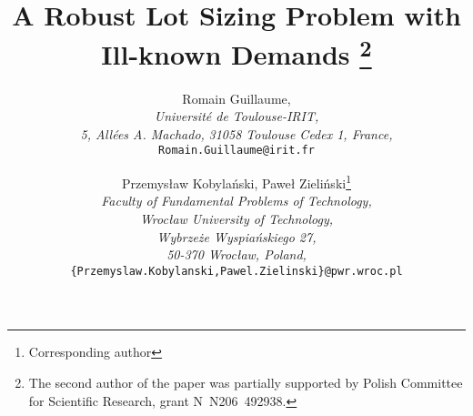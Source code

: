 \documentclass[11pt]{article}
\newenvironment{keyword}{\par{\noindent\bf Keywords:}}
\begin{document}
\title{A  Robust Lot Sizing Problem with Ill-known Demands
\thanks{The second author of the paper 
was partially supported by 
Polish Committee for Scientific Research, grant
 N~N206~492938.}
}





 
\author{
Romain    Guillaume,\\
{\small \textit{Universit{\'e} de Toulouse-IRIT,}}\\
{\small \textit{5, All{\'e}es A. Machado,}}
{\small \textit{31058 Toulouse Cedex 1, France,}}\\
{\small \texttt{Romain.Guillaume@irit.fr}}
  \and
  Przemys{\l}aw Kobyla{\'n}ski, Pawe{\l} Zieli{\'n}ski\footnote{Corresponding author} \\
{\small \textit{Faculty of Fundamental Problems of Technology,}}\\
{\small \textit{Wroc{\l}aw University of Technology,}}\\
{\small \textit{Wybrze{\.z}e Wyspia{\'n}skiego 27,}}\\
{\small \textit{50-370 Wroc{\l}aw, Poland,}}\\
{\small \texttt{\{Przemyslaw.Kobylanski,Pawel.Zielinski\}@pwr.wroc.pl}}
}





\date{}



\maketitle







\begin{abstract}
The paper deals with a  lot sizing
 problem with ill-known demands
 modeled by fuzzy intervals whose membership functions are
 possibility distributions for the values of the uncertain demands.
  Optimization criteria, in the setting of possibility theory, that
  lead to choose robust production plans under fuzzy demands are given. 
  Some algorithms for determining optimal robust production plans
   with respect to the proposed criteria,  and for evaluating production plans are provided.
  Some computational experiments are presented.
\end{abstract}

\begin{keyword}
 Fuzzy Optimization,
Dynamic Lot Sizing,
 Uncertain Demand,
  Possibility Theory
\end{keyword}
\end{document}
